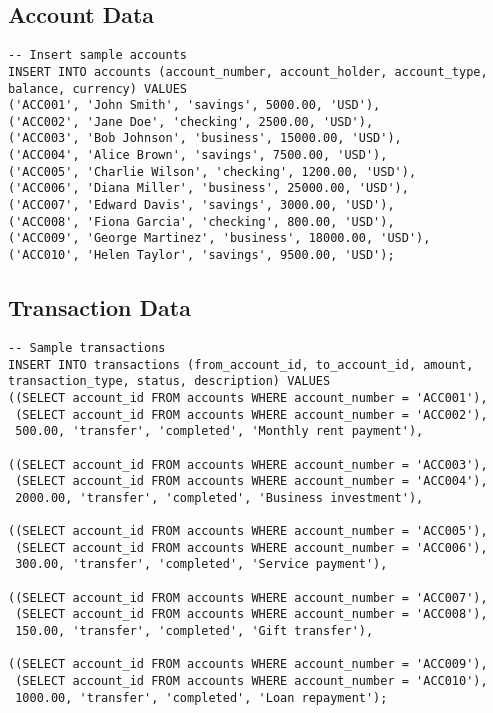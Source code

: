 \subsection{Account Data}

\begin{verbatim}
-- Insert sample accounts
INSERT INTO accounts (account_number, account_holder, account_type, balance, currency) VALUES
('ACC001', 'John Smith', 'savings', 5000.00, 'USD'),
('ACC002', 'Jane Doe', 'checking', 2500.00, 'USD'),
('ACC003', 'Bob Johnson', 'business', 15000.00, 'USD'),
('ACC004', 'Alice Brown', 'savings', 7500.00, 'USD'),
('ACC005', 'Charlie Wilson', 'checking', 1200.00, 'USD'),
('ACC006', 'Diana Miller', 'business', 25000.00, 'USD'),
('ACC007', 'Edward Davis', 'savings', 3000.00, 'USD'),
('ACC008', 'Fiona Garcia', 'checking', 800.00, 'USD'),
('ACC009', 'George Martinez', 'business', 18000.00, 'USD'),
('ACC010', 'Helen Taylor', 'savings', 9500.00, 'USD');
\end{verbatim}

\subsection{Transaction Data}

\begin{verbatim}
-- Sample transactions
INSERT INTO transactions (from_account_id, to_account_id, amount, transaction_type, status, description) VALUES
((SELECT account_id FROM accounts WHERE account_number = 'ACC001'),
 (SELECT account_id FROM accounts WHERE account_number = 'ACC002'),
 500.00, 'transfer', 'completed', 'Monthly rent payment'),

((SELECT account_id FROM accounts WHERE account_number = 'ACC003'),
 (SELECT account_id FROM accounts WHERE account_number = 'ACC004'),
 2000.00, 'transfer', 'completed', 'Business investment'),

((SELECT account_id FROM accounts WHERE account_number = 'ACC005'),
 (SELECT account_id FROM accounts WHERE account_number = 'ACC006'),
 300.00, 'transfer', 'completed', 'Service payment'),

((SELECT account_id FROM accounts WHERE account_number = 'ACC007'),
 (SELECT account_id FROM accounts WHERE account_number = 'ACC008'),
 150.00, 'transfer', 'completed', 'Gift transfer'),

((SELECT account_id FROM accounts WHERE account_number = 'ACC009'),
 (SELECT account_id FROM accounts WHERE account_number = 'ACC010'),
 1000.00, 'transfer', 'completed', 'Loan repayment');
\end{verbatim}


